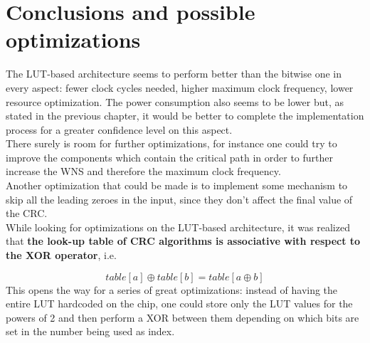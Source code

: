 %
\chapter{Conclusions and possible optimizations}\label{ch:conclusions}
The LUT-based architecture seems to perform better than the bitwise one in every aspect: fewer clock cycles needed, higher maximum clock frequency, lower resource optimization. The power consumption also seems to be lower but, as stated in the previous chapter, it would be better to complete the implementation process for a greater confidence level on this aspect.\\
\hfill \break
There surely is room for further optimizations, for instance one could try to improve the components which contain the critical path in order to further increase the WNS and therefore the maximum clock frequency.\\
Another optimization that could be made is to implement some mechanism to skip all the leading zeroes in the input, since they don't affect the final value of the CRC.\\
\hfill \break
While looking for optimizations on the LUT-based architecture, it was realized that \textbf{the look-up table of CRC algorithms is associative with respect to the XOR operator}, i.e.

\begin{equation}\label{eq:LUT_assoc}
table[a] \oplus table[b] = table[a \oplus b]
\end{equation}
\hfill \break
This opens the way for a series of great optimizations: instead of having the entire LUT hardcoded on the chip, one could store only the LUT values for the powers of 2 and then perform a XOR between them depending on which bits are set in the number being used as index.\\